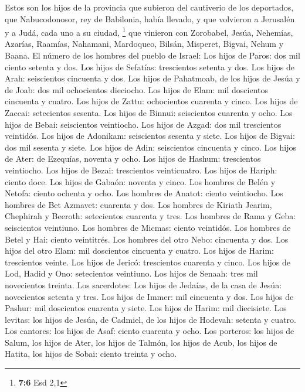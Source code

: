 \begin{paracol}{2}
 Estos son los hijos de la provincia que subieron del
cautiverio de los deportados, que Nabucodonosor, rey de Babilonia, había
llevado, y que volvieron a Jerusalén y a Judá, cada uno a su ciudad,
\footnote{\textbf{7:6} Esd 2,1}  que vinieron con
Zorobabel, Jesúa, Nehemías, Azarías, Raamías, Nahamani, Mardoqueo,
Bilsán, Misperet, Bigvai, Nehum y Baana. El número de los hombres del
pueblo de Israel:  Los hijos de Paros: dos mil ciento
setenta y dos.  Los hijos de Sefatías: trescientos setenta
y dos.  Los hijos de Arah: seiscientos cincuenta y dos.
 Los hijos de Pahatmoab, de los hijos de Jesúa y de Joab:
dos mil ochocientos dieciocho.  Los hijos de Elam: mil
doscientos cincuenta y cuatro.  Los hijos de Zattu:
ochocientos cuarenta y cinco.  Los hijos de Zaccai:
setecientos sesenta.  Los hijos de Binnui: seiscientos
cuarenta y ocho.  Los hijos de Bebai: seiscientos
veintiocho.  Los hijos de Azgad: dos mil trescientos
veintidós.  Los hijos de Adonikam: seiscientos sesenta y
siete.  Los hijos de Bigvai: dos mil sesenta y siete.
 Los hijos de Adin: seiscientos cincuenta y cinco.
 Los hijos de Ater: de Ezequías, noventa y ocho.
 Los hijos de Hashum: trescientos veintiocho.
 Los hijos de Bezai: trescientos veinticuatro.
 Los hijos de Hariph: ciento doce.  Los
hijos de Gabaón: noventa y cinco.  Los hombres de Belén y
Netofa: ciento ochenta y ocho.  Los hombres de Anatot:
ciento veintiocho.  Los hombres de Bet Azmavet: cuarenta
y dos.  Los hombres de Kiriath Jearim, Chephirah y
Beeroth: setecientos cuarenta y tres.  Los hombres de
Rama y Geba: seiscientos veintiuno.  Los hombres de
Micmas: ciento veintidós.  Los hombres de Betel y Hai:
ciento veintitrés.  Los hombres del otro Nebo: cincuenta
y dos.  Los hijos del otro Elam: mil doscientos cincuenta
y cuatro.  Los hijos de Harim: trescientos veinte.
 Los hijos de Jericó: trescientos cuarenta y cinco.
 Los hijos de Lod, Hadid y Ono: setecientos veintiuno.
 Los hijos de Senaah: tres mil novecientos treinta.
 Los sacerdotes: Los hijos de Jedaías, de la casa de
Jesúa: novecientos setenta y tres.  Los hijos de Immer:
mil cincuenta y dos.  Los hijos de Pashur: mil doscientos
cuarenta y siete.  Los hijos de Harim: mil diecisiete.
 Los levitas: los hijos de Jesúa, de Cadmiel, de los
hijos de Hodevah: setenta y cuatro.  Los cantores: los
hijos de Asaf: ciento cuarenta y ocho.  Los porteros: los
hijos de Salum, los hijos de Ater, los hijos de Talmón, los hijos de
Acub, los hijos de Hatita, los hijos de Sobai: ciento treinta y ocho.


\end{paracol}
